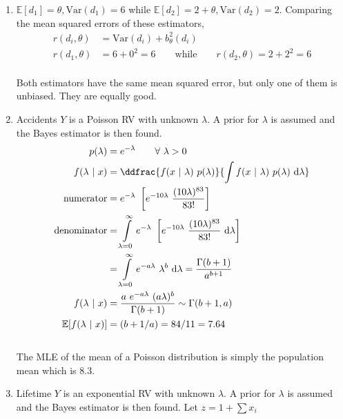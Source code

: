 \begin{enumerate}
	
	\item  $ \mathbb{E}[d_1] = \theta, \mathrm{Var}(d_1) = 6 $ while $ \mathbb{E}[d_2] = 2 + \theta, \mathrm{Var}(d_2) = 2 $. Comparing the mean squared errors of these estimators,\\
	
		\begin{align}
			r(d_i, \theta) &= \mathrm{Var}(d_i) + b_\theta^2 (d_i) \nonumber \\
			r(d_1, \theta) &= 6 + 0^2 = 6 \qquad \text{while} \qquad r(d_2, \theta) = 2 + 2^2 = 6
		\end{align}\\
		Both estimators have the same mean squared error, but only one of them is unbiased. They are equally good. \\
	
	
	\item Accidents $ Y $ is a Poisson RV with unknown $ \lambda $. A prior for $ \lambda $ is assumed and the Bayes estimator is then found. \\
	
		\begin{align}
			p(\lambda) &= e^{-\lambda} \qquad \forall\ \lambda > 0 \nonumber \\
			f(\lambda\ |\ x) &= \ddfrac{f(x\ |\ \lambda)\ p(\lambda)}{\int f(x\ |\ \lambda)\ p(\lambda)\ \mathrm{d}\lambda} \\
			\text{numerator}&= e^{-\lambda}\ \left[e^{-10\lambda}\ \dfrac{(10\lambda)^{83}}{83!}\right] \nonumber \\
			\text{denominator}&= \int\limits_{\lambda=0}^{\infty} e^{-\lambda}\ \left[e^{-10\lambda}\ \dfrac{(10\lambda)^{83}}{83!}\ \mathrm{d}\lambda\right] \nonumber \\
			&= \int\limits_{\lambda=0}^{\infty} e^{-a\lambda}\ \lambda^{b}\ \mathrm{d}\lambda = \frac{\Gamma(b+1)}{a^{b+1}}\nonumber \\
			f(\lambda\ |\ x) &= \frac{a\ e^{-a\lambda}\ (a\lambda)^{b}}{\Gamma(b+1)} \sim \Gamma(b+1, a) \\
			\mathbb{E}[f(\lambda\ |\ x)] &= (b+1/a) = 84/11 = 7.64
		\end{align}\\
		
		The MLE of the mean of a Poisson distribution is simply the population mean which is $ 8.3 $.
	
	
	\item Lifetime $ Y $ is an exponential RV with unknown $ \lambda $. A prior for $ \lambda $ is assumed and the Bayes estimator is then found. Let $ z = 1 + \sum x_i $\\
	

\end{enumerate}
